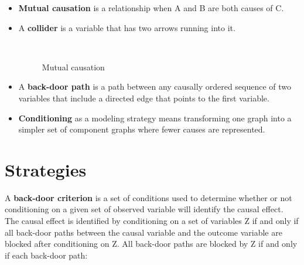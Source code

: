 \begin{itemize}
\item \textbf{Mutual causation} is a relationship when A and B are both causes of C. 

\item A \textbf{collider} is a variable that has two arrows running into it.

\begin{figure}[htp]\centering
\caption{Mutual causation}\
\end{figure}

\item A \textbf{back-door path} is a path between any causally ordered sequence  of two variables that include a directed edge that points to the first variable. 

\item \textbf{Conditioning} as a modeling strategy means transforming one graph into a simpler set of component graphs where fewer causes are represented.

\end{itemize}

\section*{Strategies}

A \textbf{back-door criterion} is a set of conditions used to determine whether or not conditioning on a given set of observed variable will identify the causal effect. The causal effect is identified by conditioning on a set of variables Z if and only if all back-door paths between the causal variable and the outcome variable are blocked after conditioning on Z. All back-door paths are blocked by Z if and only if each back-door path:

